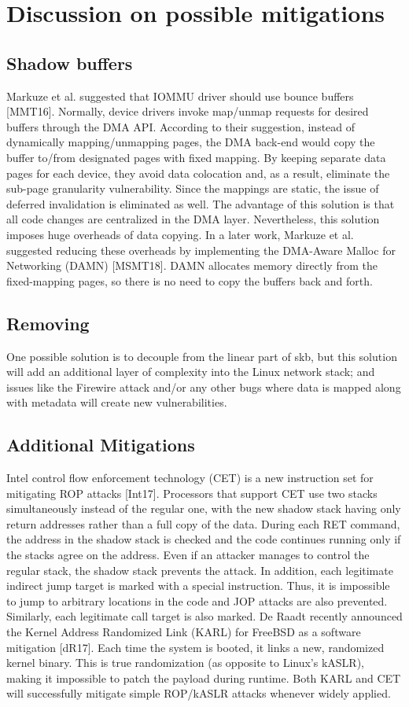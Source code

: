 \section{Discussion on possible mitigations}
\subsection{Shadow buffers}
 Markuze et al. suggested that IOMMU driver should use bounce buffers [MMT16]. Normally, device drivers invoke map/unmap requests for desired buffers through the DMA API. According to their suggestion, instead of dynamically mapping/unmapping pages, the DMA back-end would copy the buffer to/from designated pages with fixed mapping. By keeping separate data pages for each device, they avoid data colocation and, as a result, eliminate the sub-page granularity vulnerability. Since the mappings are static, the issue of deferred invalidation is eliminated as well. The advantage of this solution is that all code changes are centralized in the DMA layer. Nevertheless, this solution imposes huge overheads of data copying. In a later work, Markuze et al. suggested reducing these overheads by implementing the DMA-Aware Malloc for Networking (DAMN) [MSMT18]. DAMN allocates memory directly from the fixed-mapping pages, so there is no need to copy the buffers back and forth. 
\subsection{Removing \shinfo}
One possible solution is to decouple \shinfo from the linear part of skb, but this solution will add an additional layer of complexity into the Linux network stack; and issues like the Firewire attack and/or any other bugs where data is mapped along with metadata will create new vulnerabilities. 
\subsection{Additional Mitigations}
Intel control flow enforcement technology (CET) is a new instruction set for mitigating ROP attacks [Int17]. Processors that support CET use two stacks simultaneously instead of the regular one, with the new shadow stack having only return addresses rather than a full copy of the data. During each RET command, the address in the shadow stack is checked and the code continues running only if the stacks agree on the address. Even if an attacker manages to control the regular stack, the shadow stack prevents the attack. In addition, each legitimate indirect jump target is marked with a special instruction. Thus, it is impossible to jump to arbitrary locations in the code and JOP attacks are also prevented. Similarly, each legitimate call target is also marked. De Raadt recently announced the Kernel Address Randomized Link (KARL) for FreeBSD as a software mitigation [dR17]. Each time the system is booted, it links a new, randomized kernel binary. This is true randomization (as opposite to Linux’s kASLR), making it impossible to patch the payload during runtime. Both KARL and CET will successfully mitigate simple ROP/kASLR attacks whenever widely applied.